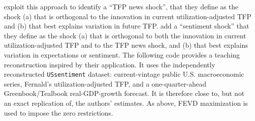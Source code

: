 \documentclass[
  11pt,
]{book}
\theoremstyle{definition}
\theoremstyle{definition}
\theoremstyle{definition}
\theoremstyle{definition}
\theoremstyle{remark}
\begin{document}
\citet{BARSKY2011273} exploit this approach to identify a ``TFP news shock'', that they define as the shock (a) that is orthogonal to the innovation in current utilization-adjusted TFP and (b) that best explains variation in future TFP. \citet{Levchenko_Pandalai-Nayar_2018} add a ``sentiment shock'' that they define as the shock (a) that is orthogonal to both the innovation in current utilization-adjusted TFP and to the TFP news shock, and (b) that best explains variation in expectations or sentiment. The following code provides a teaching reconstruction inspired by their application. It uses the independently reconstructed \texttt{USsentiment} dataset: current-vintage public U.S. macroeconomic series, Fernald's utilization-adjusted TFP, and a one-quarter-ahead Greenbook/Tealbook real-GDP-growth forecast. It is therefore close to, but not an exact replication of, the authors' estimates. As above, FEVD maximization is used to impose the zero restrictions.
\end{document}
